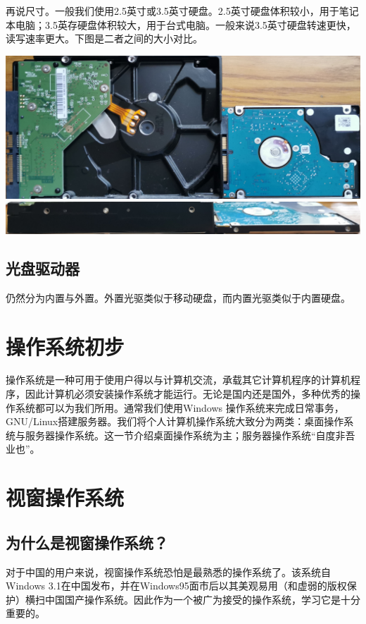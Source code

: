 再说尺寸。一般我们使用2.5英寸或3.5英寸硬盘。2.5英寸硬盘体积较小，用于笔记本电脑；3.5英存硬盘体积较大，用于台式电脑。一般来说3.5英寸硬盘转速更快，读写速率更大。下图是二者之间的大小对比。
\begin{center}
	\includegraphics[scale=0.05]{pic/HD2}\\\includegraphics[scale=0.05]{pic/HD3}	
\end{center} \par
\subsection{光盘驱动器}
仍然分为内置与外置。外置光驱类似于移动硬盘，而内置光驱类似于内置硬盘。
\section{操作系统初步}
操作系统是一种可用于使用户得以与计算机交流，承载其它计算机程序的计算机程序，因此计算机必须安装操作系统才能运行。无论是国内还是国外，多种优秀的操作系统都可以为我们所用。通常我们使用Windows 操作系统来完成日常事务，GNU/Linux搭建服务器。我们将个人计算机操作系统大致分为两类：桌面操作系统与服务器操作系统。这一节介绍桌面操作系统为主；服务器操作系统“自度非吾业也”。
\section{视窗操作系统}
\subsection{为什么是视窗操作系统？}
对于中国的用户来说，视窗操作系统恐怕是最熟悉的操作系统了。该系统自Windows 3.1在中国发布，并在Windows95面市后以其美观易用（和虚弱的版权保护）横扫中国国产操作系统。因此作为一个被广为接受的操作系统，学习它是十分重要的。

